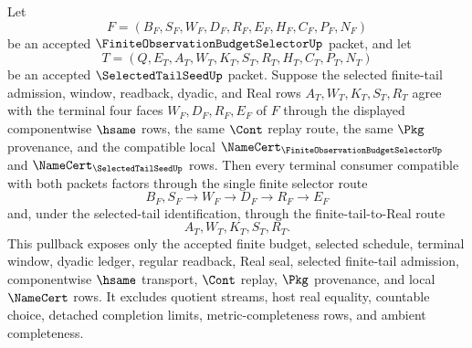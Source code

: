 \begin{theorem}
\label{thm:finite-observation-budget-selector-selected-tail-terminal-pullback}
Let
$$
F=(B_F,S_F,W_F,D_F,R_F,E_F,H_F,C_F,P_F,N_F)
$$
be an accepted $\FiniteObservationBudgetSelectorUp$ packet, and let
$$
T=(Q,E_T,A_T,W_T,K_T,S_T,R_T,H_T,C_T,P_T,N_T)
$$
be an accepted $\SelectedTailSeedUp$ packet. Suppose the selected finite-tail admission, window, readback, dyadic, and Real rows $A_T,W_T,K_T,S_T,R_T$ agree with the terminal four faces $W_F,D_F,R_F,E_F$ of $F$ through the displayed componentwise $\hsame$ rows, the same $\Cont$ replay route, the same $\Pkg$ provenance, and the compatible local $\NameCert_{\FiniteObservationBudgetSelectorUp}$ and $\NameCert_{\SelectedTailSeedUp}$ rows. Then every terminal consumer compatible with both packets factors through the single finite selector route
$$
B_F,S_F \to W_F \to D_F \to R_F \to E_F
$$
and, under the selected-tail identification, through the finite-tail-to-Real route
$$
A_T,W_T,K_T,S_T,R_T.
$$
This pullback exposes only the accepted finite budget, selected schedule, terminal window, dyadic ledger, regular readback, Real seal, selected finite-tail admission, componentwise $\hsame$ transport, $\Cont$ replay, $\Pkg$ provenance, and local $\NameCert$ rows. It excludes quotient streams, host real equality, countable choice, detached completion limits, metric-completeness rows, and ambient completeness.
\end{theorem}
